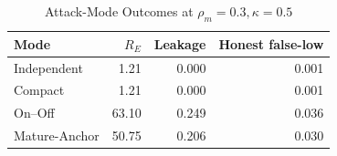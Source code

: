 \begin{table}[!t]
\centering
\caption{Attack-Mode Outcomes at $\rho_m=0.3,\kappa=0.5$}
\label{tab:rq3-modes}
\scriptsize
\setlength{\tabcolsep}{3.4pt}
\renewcommand{\arraystretch}{1.08}
\begin{tabular}{lrrr}
\toprule
Mode & $R_E$ & Leakage & Honest false-low \\
\midrule
Independent & 1.21 & 0.000 & 0.001 \\
Compact & 1.21 & 0.000 & 0.001 \\
On--Off & 63.10 & 0.249 & 0.036 \\
Mature-Anchor & 50.75 & 0.206 & 0.030 \\
\bottomrule
\end{tabular}
\end{table}
